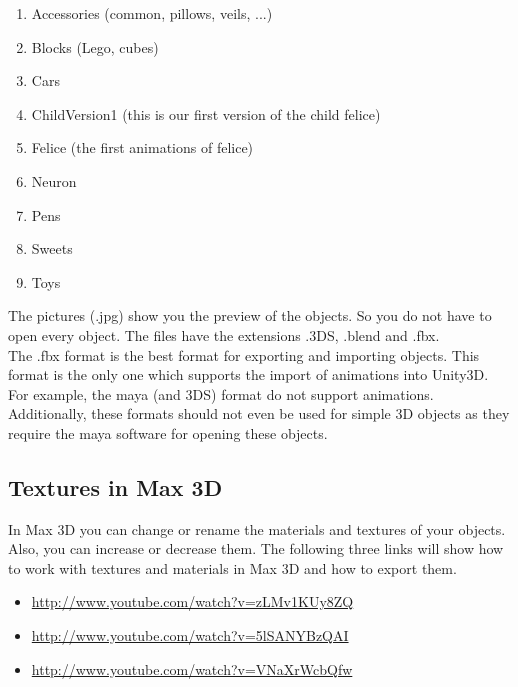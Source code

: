 \documentclass[10pt,final]{scrreprt}
\begin{document}
\begin{enumerate}
\item Accessories (common, pillows, veils, ...)
\item Blocks (Lego, cubes)
\item Cars
\item ChildVersion1 (this is our first version of the child felice)
\item Felice (the first animations of felice)
\item Neuron
\item Pens
\item Sweets
\item Toys
\end{enumerate}

The pictures (.jpg) show you the preview of the objects. So you do not have to open every object. The files have the extensions .3DS, .blend and .fbx.\\
The .fbx format is the best format for exporting and importing objects. This format is the only one which supports the import of animations into Unity3D. For example, the maya (and 3DS) format do not support animations. Additionally, these formats should not even be used for simple 3D objects as they require the maya software for opening these objects.

\subsection{Textures in Max 3D}
In Max 3D you can change or rename the materials and textures of your objects. Also, you can increase or decrease them. 
The following three links will show how to work with textures and materials in Max 3D and how to export them.

\begin{itemize}
\item \url{http://www.youtube.com/watch?v=zLMv1KUy8ZQ}
\item \url{http://www.youtube.com/watch?v=5lSANYBzQAI}
\item \url{http://www.youtube.com/watch?v=VNaXrWcbQfw} 
\end{itemize}
\end{document}

